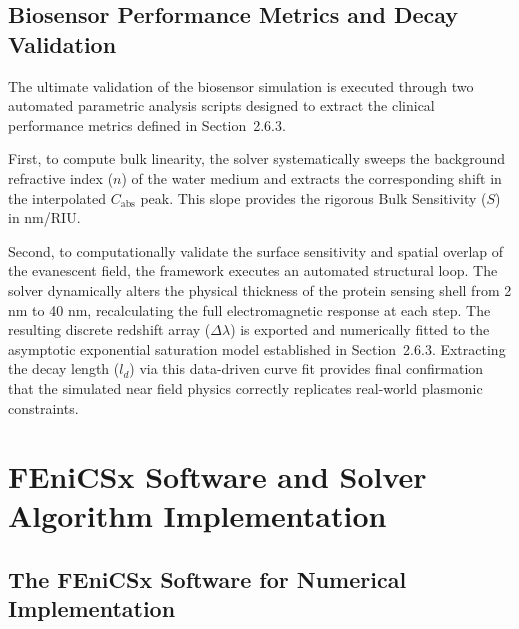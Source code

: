 \subsection{Biosensor Performance Metrics and Decay Validation}

The ultimate validation of the biosensor simulation is executed through two automated parametric analysis scripts designed to extract the clinical performance metrics defined in Section~2.6.3.

\vspace{12pt}

First, to compute bulk linearity, the solver systematically sweeps the background refractive index ($n$) of the water medium and extracts the corresponding shift in the interpolated $C_{\text{abs}}$ peak. This slope provides the rigorous Bulk Sensitivity ($S$) in nm/RIU.

\vspace{12pt}

Second, to computationally validate the surface sensitivity and spatial overlap of the evanescent field, the framework executes an automated structural loop. The solver dynamically alters the physical thickness of the protein sensing shell from 2 nm to 40 nm, recalculating the full electromagnetic response at each step. The resulting discrete redshift array ($\Delta\lambda$) is exported and numerically fitted to the asymptotic exponential saturation model established in Section~2.6.3. Extracting the decay length ($l_d$) via this data-driven curve fit provides final confirmation that the simulated near field physics correctly replicates real-world plasmonic constraints.

\section{FEniCSx Software and Solver Algorithm Implementation}

\subsection{The FEniCSx Software for Numerical Implementation}

